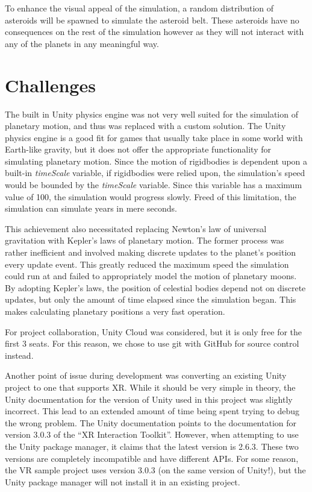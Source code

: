 \documentclass{article}
\begin{document}
    To enhance the visual appeal of the simulation, a random distribution of asteroids will be spawned to simulate the asteroid belt. These asteroids have no consequences on the rest of the simulation however as they will not interact with any of the planets in any meaningful way.
    \section{Challenges}

    The built in Unity physics engine was not very well suited for the simulation of planetary motion, and thus was replaced with a custom solution. The Unity physics engine is a good fit for games that usually take place in some world with Earth-like gravity, but it does not offer the appropriate functionality for simulating planetary motion. Since the motion of rigidbodies is dependent upon a built-in \emph{timeScale} variable, if rigidbodies were relied upon, the simulation's speed would be bounded by the \emph{timeScale} variable. Since this variable has a maximum value of 100, the simulation would progress slowly. Freed of this limitation, the simulation can simulate years in mere seconds.

    This achievement also necessitated replacing Newton's law of universal gravitation with Kepler's laws of planetary motion. The former process was rather inefficient and involved making discrete updates to the planet's position every update event. This greatly reduced the maximum speed the simulation could run at and failed to appropriately model the motion of planetary moons. By adopting Kepler's laws, the position of celestial bodies depend not on discrete updates, but only the amount of time elapsed since the simulation began. This makes calculating planetary positions a very fast operation.

    For project collaboration, Unity Cloud was considered, but it is only free for the first 3 seats. For this reason, we chose to use git with GitHub for source control instead.

    Another point of issue during development was converting an existing Unity project to one that supports XR. While it should be very simple in theory, the Unity documentation for the version of Unity used in this project was slightly incorrect. This lead to an extended amount of time being spent trying to debug the wrong problem. The Unity documentation points to the documentation for version 3.0.3 of the ``XR Interaction Toolkit''. However, when attempting to use the Unity package manager, it claims that the latest version is 2.6.3. These two versions are completely incompatible and have different APIs. For some reason, the VR sample project uses version 3.0.3 (on the same version of Unity!), but the Unity package manager will not install it in an existing project.
    \newpage
    
    
\end{document}
